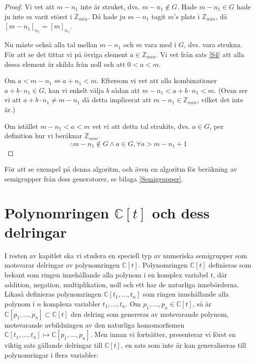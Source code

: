 \begin{enumerate}
\begin{proof}
Vi vet att $m-n_1$ inte är struket, dvs. $m-n_1 \notin G$. Hade $m-n_1 \in G$ hade ju inte $m$ varit störst i $\mathbb{Z}_{min}$. Då hade ju $m-n_1$ tagit $m$'s plats i $\mathbb{Z}_{min}$, då $[m-n_1]_{n_1} = [m]_{n_1}$.

Nu måste också alla tal mellan $m-n_1$ och $m$ vara med i $G$, dvs. vara strukna. För att se det tittar vi på övriga element $a \in \mathbb{Z}_{min}$. Vi vet från sats \ref{S4} att alla dessa element är skilda från noll och att $0 < a < m$.

Om $a < m-n_1 \Longleftrightarrow a+n_1<m$. Eftersom vi vet att alla kombinationer $a+b\cdot n_1 \in G$, kan vi enkelt välja $b$ sådan att $m-n_1 < a+b\cdot n_1 < m$. (Ovan ser vi att $a+b\cdot n_1 \neq m-n_1$ då detta implicerat att $m-n_1 \in \mathbb{Z}_{min}$, vilket det inte är.)

Om istället $m-n_1 < a < m$ vet vi att detta tal strukits, dvs. $a \in G$, per definition hur vi beräknar $\mathbb{Z}_{min}$.
\[\therefore m-n_1 \notin G \wedge a \in G, \forall a > m-n_1+1\]
\end{proof}
\end{enumerate}

För att se exempel på denna algoritm, och även en algoritm för beräkning av semigrupper från dess generatorer, se bilaga \ref{Semigrupper}.

\section{Polynomringen $\mathbb{C}[t]$ och dess delringar}

I resten av kapitlet ska vi studera en speciell typ av numeriska semigrupper som motsvarar delringar av polynomringen $\mathbb{C}[t]$. Polynomringen $\mathbb{C}[t]$ definieras som bekant som ringen innehållande alla polynom i en komplex variabel $t$, där addition, negation, multiplikation, noll och ett har de naturliga innebörderna. Likaså definieras polynomringen $\mathbb{C}[t_1,\ldots,t_n]$ som ringen innehållande alla polynom i $n$ komplexa variabler $t_1,\ldots,t_n$. Om $p_1,\ldots,p_n \in \mathbb{C}[t]$, så är $\mathbb{C}[p_1,\ldots,p_n] \subset \mathbb{C}[t]$ den delring som genereras av motsvarande polynom, motsvarande avbildningen av den naturliga homomorfismen $\mathbb{C}[t_1,\ldots,t_n] \mapsto \mathbb{C}[p_1,\ldots,p_n]$. Men innan vi fortsätter, presenterar vi först en viktig sats gällande delringar till $\mathbb{C}[t]$, en sats som inte är kan generaliseras till polynomringar i flera variabler:

